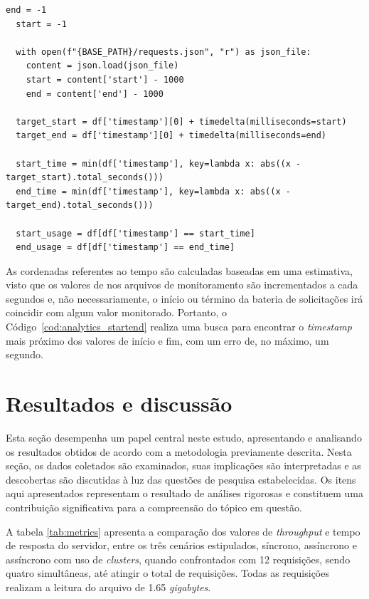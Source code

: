 \documentclass[12pt]{article}
\begin{document}
\begin{lstlisting}[caption={Recuperação das coordenadas de início e fim da bateria de solicitações.}, label=cod:analytics_startend:fig]
	end = -1
  start = -1

  with open(f"{BASE_PATH}/requests.json", "r") as json_file:
    content = json.load(json_file)
    start = content['start'] - 1000
    end = content['end'] - 1000

  target_start = df['timestamp'][0] + timedelta(milliseconds=start)
  target_end = df['timestamp'][0] + timedelta(milliseconds=end)

  start_time = min(df['timestamp'], key=lambda x: abs((x - target_start).total_seconds()))
  end_time = min(df['timestamp'], key=lambda x: abs((x - target_end).total_seconds()))

  start_usage = df[df['timestamp'] == start_time]
  end_usage = df[df['timestamp'] == end_time]
\end{lstlisting}

As cordenadas referentes ao tempo são calculadas baseadas em uma estimativa, visto que os valores de 
nos arquivos de monitoramento são incrementados a cada segundos e, não necessariamente, o início ou término da bateria de 
solicitações irá coincidir com algum valor monitorado. Portanto, o Código~\ref{cod:analytics_startend} realiza uma busca
para encontrar o \textit{timestamp} mais próximo dos valores de início e fim, com um erro de, no máximo, um segundo.

\section{Resultados e discussão}

Esta seção desempenha um papel central neste estudo, apresentando e analisando os resultados obtidos de 
acordo com a metodologia previamente descrita. Nesta seção, os dados coletados são examinados, suas implicações são interpretadas 
e as descobertas são discutidas à luz das questões de pesquisa estabelecidas. Os itens aqui apresentados representam o 
resultado de análises rigorosas e constituem uma contribuição significativa para a compreensão do tópico em questão.

A tabela \autoref{tab:metrics} apresenta a comparação dos valores de \textit{throughput} e tempo de resposta do servidor,
entre os três cenários estipulados, síncrono, assíncrono e assíncrono com uso de \textit{clusters}, quando confrontados
com 12 requisições, sendo quatro simultâneas, até atingir o total de requisições. Todas as requisições realizam a leitura
do arquivo de 1.65 \textit{gigabytes}. 
\end{document}
